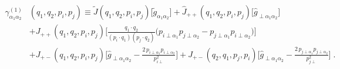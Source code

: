 \documentclass[a4paper,11pt]{article}
\begin{document}
\begin{equation}
\begin{split}
\gamma^{(1)}_{\alpha_1 \alpha_2}& (q_1, q_2, p_i, p_j) \equiv \tilde{J}(q_1, q_2, p_i, p_j) \big[ \tilde{g}_{\alpha_1 \alpha_2} \big] + \hat{J}_{++} (q_1, q_2, p_i, p_j) \big[ \hat{g}_{\perp\alpha_1 \alpha_2} \big] \\[.2cm]
 &+J_{++}(q_1, q_2, p_i, p_j) \bigg[  \frac{q_1 \cdot q_2}{(p_i \cdot q_1) (p_j \cdot q_2)} \big( p_{i\perp\alpha_1} p_{j\perp\alpha_2} - p_{j\perp\alpha_1} p_{i\perp\alpha_2} \big) \bigg] \\[.2cm]
 &+J_{+-}(q_1, q_2, p_i, p_j) \bigg[ \hat{g}_{\perp \alpha_1 \alpha_2} - \frac{2 \, p_{i\perp\alpha_1} p_{i\perp\alpha_2}}{p_{i\perp}^2} \bigg] + J_{+-}(q_2, q_1, p_j, p_i) \bigg[ \hat{g}_{\perp \alpha_1 \alpha_2} - \frac{2 \, p_{j\perp\alpha_1} p_{j\perp\alpha_2}}{p_{j\perp}^2} \bigg] \; .
\end{split}
\end{equation}
%
\end{document}
